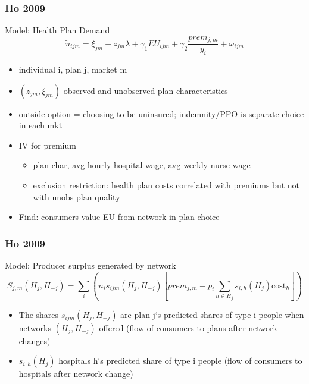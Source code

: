 \documentclass[xcolor=pdftex,dvipsnames,table,mathserif]{beamer}
\begin{document}
\begin{frame}
\frametitle{Ho 2009}

Model: Health Plan Demand
\[
\widetilde{u}_{ijm}=\xi _{jm}+z_{jm}\lambda +\gamma _{1}EU_{ijm}+\gamma _{2}%
\frac{prem_{j,m}}{y_{i}}+\omega _{ijm}
\]

\begin{itemize}
\item individual i, plan j, market m
\item $(z_{jm},\xi_{jm})$ observed and unobserved plan characteristics
\item outside option = choosing to be uninsured; indemnity/PPO is separate choice in each mkt
\item IV for premium
\begin{itemize}
\item plan char, avg hourly hospital wage, avg weekly nurse wage
\item exclusion restriction: health plan costs correlated with premiums but not with unobs plan quality
\end{itemize}
\item Find: consumers value EU from network in plan choice
\end{itemize}

\end{frame}

\begin{frame}
\frametitle{Ho 2009}

Model: Producer surplus generated by network
\[
S_{j,m}(H_{j},H_{-j})=\sum%
\limits_{i}(n_{i}s_{ijm}(H_{j},H_{-j})[prem_{j,m}-p_{i}\sum \limits_{h\in
H_{j}}s_{i,h}(H_{j})\text{cost}_{h}])
\]

\begin{itemize}
\item The shares $s_{ijm}(H_{j},H_{-j})$ are plan j`s predicted shares of type i people when networks $(H_{j},H_{-j})$ offered (flow of consumers to plans after network changes)
\item $s_{i,h}(H_{j})$ hospitals h`s predicted share of type i people (flow of consumers to hospitals after network change)

\end{itemize}

\end{frame}
\end{document}
